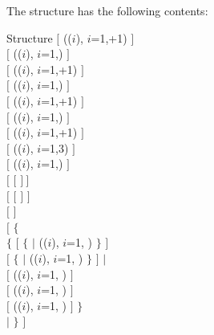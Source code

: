The  structure has the following contents:
\begin{DataStructure}{Structure }
$[$  (($i$), $i$=1,+1) $]$\\
$[$  (($i$), $i$=1,) $]$\\
$[$   (($i$), $i$=1,+1) $]$\\
$[$  (($i$), $i$=1,) $]$\\
$[$   (($i$), $i$=1,+1) $]$\\
$[$  (($i$), $i$=1,) $]$\\
$[$  (($i$), $i$=1,+1) $]$\\
$[$  (($i$), $i$=1,3) $]$\\
$[$  (($i$), $i$=1,) $]$\\
$[$   $[$  $]~]$\\
$[$   $[$  $]$ $]$\\
$[$   $]$\\
$[$ $\{$    \\
\hspace{0.75cm} $\{$  $[$  $\{$  $|$ (($i$), $i$=1, ) $\}$ $]$ \\
\hspace{1.0cm} $[$   $\{$  $|$ (($i$), $i$=1, ) $\}$ $]$  $|$ \\
\hspace{1.0cm} $[$  (($i$), $i$=1, )  $]$ \\
\hspace{1.0cm} $[$  (($i$), $i$=1, )  $]$   \\
\hspace{1.0cm} $[$  (($i$), $i$=1, )  $]$   $\}$\\
\hspace{0.3cm}$|$    $\}$ $]$
\end{DataStructure}

